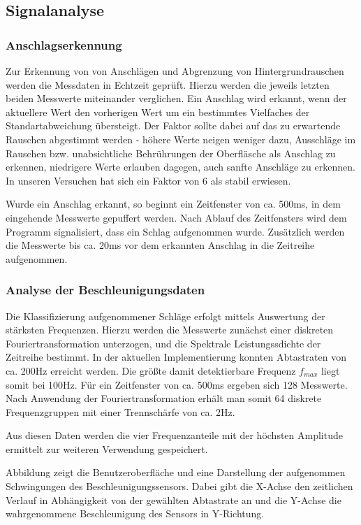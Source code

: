 \subsection*{Signalanalyse}
\label{sec:Signalanalyse}
\subsubsection*{Anschlagserkennung}
Zur Erkennung von von Anschlägen und Abgrenzung von Hintergrundrauschen werden die Messdaten in Echtzeit geprüft. Hierzu werden die jeweils letzten beiden Messwerte miteinander verglichen. Ein Anschlag wird erkannt, wenn der aktuellere Wert den vorherigen Wert um ein bestimmtes Vielfaches der Standartabweichung übersteigt. Der Faktor sollte dabei auf das zu erwartende Rauschen abgestimmt werden - höhere Werte neigen weniger dazu, Ausschläge im Rauschen bzw. unabsichtliche Behrührungen der Oberfläsche als Anschlag zu erkennen, niedrigere Werte erlauben dagegen, auch sanfte Anschläge zu erkennen. In unseren Versuchen hat sich ein Faktor von 6 als stabil erwiesen.

Wurde ein Anschlag erkannt, so beginnt ein Zeitfenster von ca. 500ms, in dem eingehende Messwerte gepuffert werden. Nach Ablauf des Zeitfensters wird dem Programm signalisiert, dass ein Schlag aufgenommen wurde. Zusätzlich werden die Messwerte bis ca. 20ms vor dem erkannten Anschlag in die Zeitreihe aufgenommen.

\subsubsection*{Analyse der Beschleunigungsdaten}
Die Klassifizierung aufgenommener Schläge erfolgt mittels Auswertung der stärksten Frequenzen. Hierzu werden die Messwerte zunächst einer diskreten Fouriertransformation unterzogen, und die Spektrale Leistungssdichte der Zeitreihe bestimmt.
In der aktuellen Implementierung konnten Abtastraten von ca. 200Hz erreicht werden. Die größte damit detektierbare Frequenz $f_{max}$ liegt somit bei 100Hz.
Für ein Zeitfenster von ca. 500ms ergeben sich 128 Messwerte.
Nach Anwendung der Fouriertransformation erhält man somit 64 diskrete Frequenzgruppen mit einer Trennschärfe von ca. 2Hz.

Aus diesen Daten werden die vier Frequenzanteile mit der höchsten Amplitude ermittelt zur weiteren Verwendung gespeichert.

Abbildung zeigt die Benutzeroberfläche und eine Darstellung der aufgenommen Schwingungen des Beschleunigungssensors.
Dabei gibt die X-Achse den zeitlichen Verlauf in Abhängigkeit von der gewählten Abtastrate an und die Y-Achse die wahrgenommene Beschleunigung des Sensors in Y-Richtung.


